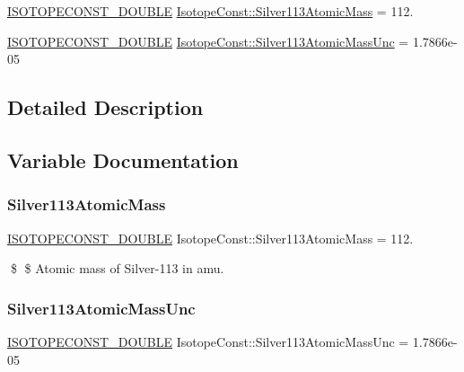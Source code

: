 \begin{DoxyCompactItemize}
\item 
\mbox{\hyperlink{group___isotope_const-_macros_ga8f45a7272ce02c0b4c65c44636ed719a}{I\+S\+O\+T\+O\+P\+E\+C\+O\+N\+S\+T\+\_\+\+D\+O\+U\+B\+LE}} \mbox{\hyperlink{group___isotope_const-_silver-_ag113_ga530601aa0401e55f5c10b8c279521d7f}{Isotope\+Const\+::\+Silver113\+Atomic\+Mass}} = 112.
\item 
\mbox{\hyperlink{group___isotope_const-_macros_ga8f45a7272ce02c0b4c65c44636ed719a}{I\+S\+O\+T\+O\+P\+E\+C\+O\+N\+S\+T\+\_\+\+D\+O\+U\+B\+LE}} \mbox{\hyperlink{group___isotope_const-_silver-_ag113_ga1c01bac89d3531c2c52fb09ec9fbf66f}{Isotope\+Const\+::\+Silver113\+Atomic\+Mass\+Unc}} = 1.\+7866e-\/05
\end{DoxyCompactItemize}


\subsection{Detailed Description}


\subsection{Variable Documentation}
\mbox{\label{group___isotope_const-_silver-_ag113_ga530601aa0401e55f5c10b8c279521d7f}} 
\subsubsection{\texorpdfstring{Silver113\+Atomic\+Mass}{Silver113AtomicMass}}
{\footnotesize\ttfamily \mbox{\hyperlink{group___isotope_const-_macros_ga8f45a7272ce02c0b4c65c44636ed719a}{I\+S\+O\+T\+O\+P\+E\+C\+O\+N\+S\+T\+\_\+\+D\+O\+U\+B\+LE}} Isotope\+Const\+::\+Silver113\+Atomic\+Mass = 112.}

\$ \$ Atomic mass of Silver-\/113 in amu. \mbox{\label{group___isotope_const-_silver-_ag113_ga1c01bac89d3531c2c52fb09ec9fbf66f}} 
\subsubsection{\texorpdfstring{Silver113\+Atomic\+Mass\+Unc}{Silver113AtomicMassUnc}}
{\footnotesize\ttfamily \mbox{\hyperlink{group___isotope_const-_macros_ga8f45a7272ce02c0b4c65c44636ed719a}{I\+S\+O\+T\+O\+P\+E\+C\+O\+N\+S\+T\+\_\+\+D\+O\+U\+B\+LE}} Isotope\+Const\+::\+Silver113\+Atomic\+Mass\+Unc = 1.\+7866e-\/05}

